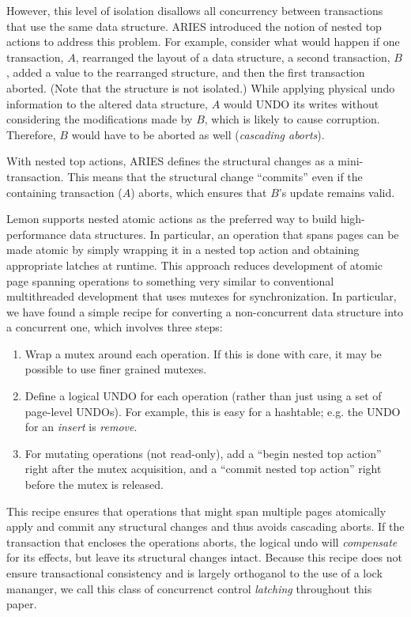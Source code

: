 \documentclass[10pt,letterpaper,twocolumn,english]{article}
\newcommand{\yad}{Lemon\xspace}
\begin{document}
However, this level of isolation disallows all concurrency between 
transactions that use the same data structure.  ARIES introduced the 
notion of nested top actions to
address this problem.  For example, consider what would happen if one
transaction, $A$, rearranged the layout of a data structure, a second
transaction, $B$, added a value to the rearranged structure, and then
the first transaction aborted.  (Note that the structure is not
isolated.)  While applying physical undo information to the altered
data structure,  $A$ would UNDO its writes
without considering the modifications made by
$B$, which is likely to cause corruption.  Therefore, $B$ would 
have to be aborted as well ({\em cascading aborts}).

With nested top actions, ARIES defines the structural changes as a
mini-transaction. This means that the structural change
``commits'' even if the containing transaction ($A$) aborts, which
ensures that $B$'s update remains valid.

\yad supports nested atomic actions as the preferred way to build
high-performance data structures. In particular, an operation that
spans pages can be made atomic by simply wrapping it in a nested top
action and obtaining appropriate latches at runtime.  This approach
reduces development of atomic page spanning operations to something
very similar to conventional multithreaded development that uses mutexes
for synchronization.
In particular, we have found a simple recipe for converting a
non-concurrent data structure into a concurrent one, which involves
three steps:
\begin{enumerate}
\item Wrap a mutex around each operation.  If this is done with care,
  it may be possible to use finer grained mutexes.
\item Define a logical UNDO for each operation (rather than just using
  a set of page-level UNDOs).  For example, this is easy for a
  hashtable; e.g. the UNDO for an {\em insert} is {\em remove}.
\item For mutating operations (not read-only), add a ``begin nested
  top action'' right after the mutex acquisition, and a ``commit
  nested top action'' right before the mutex is released.
\end{enumerate}
This recipe ensures that operations that might span multiple pages
atomically apply and commit any structural changes and thus avoids 
cascading aborts.  If the transaction that encloses the operations
aborts, the logical undo will {\em compensate} for
its effects, but leave its structural changes intact. Because this 
recipe does not ensure transactional consistency and is largely 
orthoganol to the use of a lock mananger, we call this class of 
concurrenct control {\em latching} throughout this paper.
\end{document}
